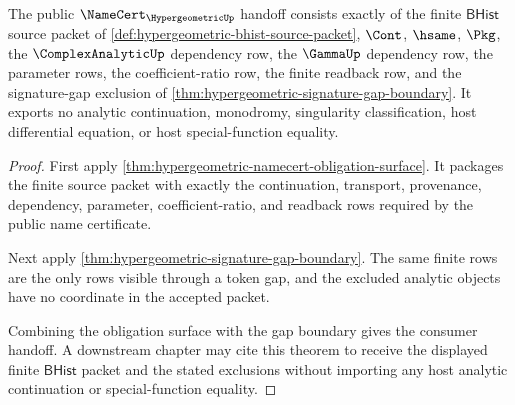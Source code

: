 \begin{theorem}
\label{thm:hypergeometric-public-certificate-handoff}
The public $\NameCert_{\HypergeometricUp}$ handoff consists exactly of the
finite $\mathsf{BHist}$ source packet of
\autoref{def:hypergeometric-bhist-source-packet}, $\Cont$, $\hsame$, $\Pkg$, the
$\ComplexAnalyticUp$ dependency row, the $\GammaUp$ dependency row, the
parameter rows, the coefficient-ratio row, the finite readback row, and the
signature-gap exclusion of
\autoref{thm:hypergeometric-signature-gap-boundary}. It exports no analytic
continuation, monodromy, singularity classification, host differential
equation, or host special-function equality.
\end{theorem}
\begin{proof}
First apply \autoref{thm:hypergeometric-namecert-obligation-surface}. It
packages the finite source packet with exactly the continuation, transport,
provenance, dependency, parameter, coefficient-ratio, and readback rows required
by the public name certificate.

Next apply \autoref{thm:hypergeometric-signature-gap-boundary}. The same finite
rows are the only rows visible through a token gap, and the excluded analytic
objects have no coordinate in the accepted packet.

Combining the obligation surface with the gap boundary gives the consumer
handoff. A downstream chapter may cite this theorem to receive the displayed
finite $\mathsf{BHist}$ packet and the stated exclusions without importing any
host analytic continuation or special-function equality.
\end{proof}

